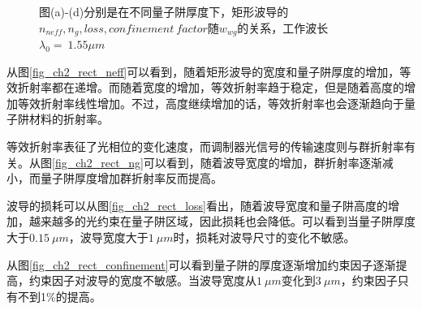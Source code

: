 \begin{figure}[htb]
{\begin{minipage}[]{0.5\textwidth}
	\end{minipage}}
\caption{图(a)-(d)分别是在不同量子阱厚度下，矩形波导的$n_{neff}, n_g, loss, confinement~factor$随$w_{wg}$的关系，工作波长$\lambda_0 = ~1.55\mu m$}
\label{fig_ch2_rect_property}
\end{figure}

从图\ref{fig_ch2_rect_neff}可以看到，随着矩形波导的宽度和量子阱厚度的增加，等效折射率都在递增。而随着宽度的增加，等效折射率趋于稳定，但是随着高度的增加等效折射率线性增加。不过，高度继续增加的话，等效折射率也会逐渐趋向于量子阱材料的折射率。

等效折射率表征了光相位的变化速度，而调制器光信号的传输速度则与群折射率有关。从图\ref{fig_ch2_rect_ng}可以看到，随着波导宽度的增加，群折射率逐渐减小，而量子阱厚度增加群折射率反而提高。

波导的损耗可以从图\ref{fig_ch2_rect_loss}看出，随着波导宽度和量子阱高度的增加，越来越多的光约束在量子阱区域，因此损耗也会降低。可以看到当量子阱厚度大于$0.15~ \mu m$，波导宽度大于$1~ \mu m$时，损耗对波导尺寸的变化不敏感。

从图\ref{fig_ch2_rect_confinement}可以看到量子阱的厚度逐渐增加约束因子逐渐提高，约束因子对波导的宽度不敏感。当波导宽度从$1 ~\mu m$变化到$3 ~\mu m$，约束因子只有不到1\%的提高。

